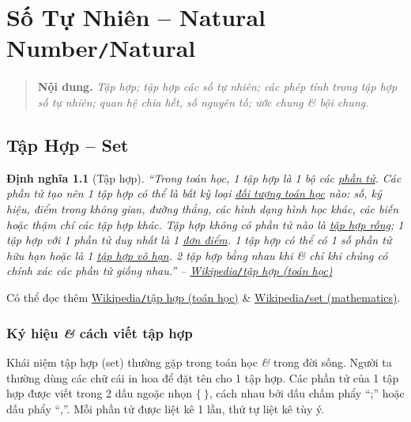 \documentclass[oneside]{book}
\numberwithin{equation}{section}
\newtheorem{dinhnghia}{Định nghĩa}[section]
\begin{document}
\chapter{Số Tự Nhiên -- Natural Number\texttt{/}Natural}

\begin{quotation}
	\textbf{Nội dung.} \textit{Tập hợp; tập hợp các số tự nhiên; các phép tính trong tập hợp số tự nhiên; quan hệ chia hết, số nguyên tố; ước chung \textit{\&} bội chung}.
\end{quotation}

\section{Tập Hợp -- Set}

\begin{dinhnghia}[Tập hợp]
	``Trong toán học, 1 \textit{tập hợp} là 1 bộ các \href{https://vi.wikipedia.org/wiki/Ph%E1%BA%A7n_t%E1%BB%AD_(to%C3%A1n_h%E1%BB%8Dc)}{phần tử}. Các phần tử tạo nên 1 tập hợp có thể là bất kỳ loại \href{https://vi.wikipedia.org/wiki/%C4%90%E1%BB%91i_t%C6%B0%E1%BB%A3ng_to%C3%A1n_h%E1%BB%8Dc}{đối tượng toán học} nào: số, ký hiệu, điểm trong không gian, đường thẳng, các hình dạng hình học khác, các biến hoặc thậm chí các tập hợp khác. Tập hợp không có phần tử nào là \href{https://vi.wikipedia.org/wiki/T%E1%BA%ADp_h%E1%BB%A3p_r%E1%BB%97ng}{tập hợp rỗng}; 1 tập hợp với 1 phần tử duy nhất là 1 \href{https://vi.wikipedia.org/wiki/%C4%90%C6%A1n_%C4%91i%E1%BB%83m_(to%C3%A1n_h%E1%BB%8Dc)}{đơn điểm}. 1 tập hợp có thể có 1 số phần tử hữu hạn hoặc là 1 \href{https://vi.wikipedia.org/wiki/T%E1%BA%ADp_h%E1%BB%A3p_v%C3%B4_h%E1%BA%A1n}{tập hợp vô hạn}. 2 tập hợp bằng nhau khi \& chỉ khi chúng có chính xác các phần tử giống nhau.'' -- \href{https://vi.wikipedia.org/wiki/T%E1%BA%ADp_h%E1%BB%A3p_(to%C3%A1n_h%E1%BB%8Dc)}{Wikipedia\emph{\texttt{/}}tập hợp (toán học)}
\end{dinhnghia}
Có thể đọc thêm \href{https://vi.wikipedia.org/wiki/T%E1%BA%ADp_h%E1%BB%A3p_(to%C3%A1n_h%E1%BB%8Dc)}{Wikipedia\texttt{/}tập hợp (toán học)} \& \href{https://en.wikipedia.org/wiki/Set_(mathematics)}{Wikipedia\texttt{/}set (mathematics)}.

\subsection{Ký hiệu \textit{\&} cách viết tập hợp}
Khái niệm tập hợp (set) thường gặp trong toán học \textit{\&} trong đời sống. Người ta thường dùng các chữ cái in hoa để đặt tên cho 1 tập hợp. Các phần tử của 1 tập hợp được viết trong 2 dấu ngoặc nhọn $\{\ \}$, cách nhau bởi dấu chấm phẩy ``;'' hoặc dấu phẩy ``,''. Mỗi phần tử được liệt kê 1 lần, thứ tự liệt kê tùy ý.
\end{document}
